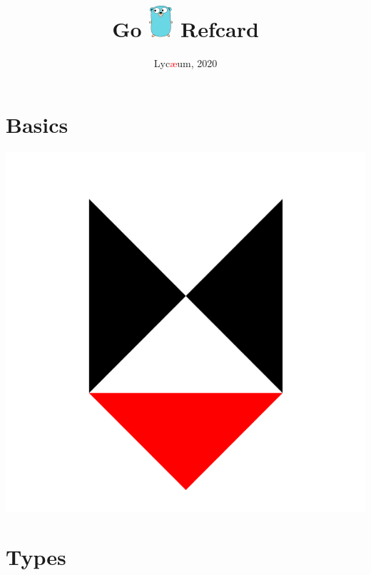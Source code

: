 \documentclass{../refsheet}
\title{Go \includegraphics{../images/golang-small.png} Refcard}
\author{Lyc\textcolor{red}{\ae{}}um, 2020}
\date{}
\begin{document}
\maketitle
\section{Basics}




\begin{center}
\includegraphics[scale=0.02]{../images/lycaeum-logo.png}
\end{center}

\section{Types}

\end{document}
